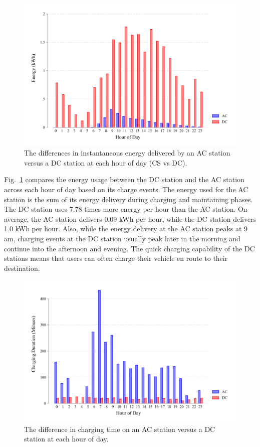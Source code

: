 \begin{figure}[H]
	\centering
	\includegraphics[width=0.8\linewidth]{acdc_e}
	\caption[Energy delivered by an AC station versus a DC station]{The differences in instantaneous energy delivered by an AC station versus a DC station at each hour of day (CS vs DC).}
	\label{fig:10:acdc_e}
\end{figure}

Fig.~\ref{fig:10:acdc_e} compares the energy usage between the DC station and the AC station across each hour of day based on its charge events. The energy used for the AC station is the sum of its energy delivery during charging and maintaining phases. The DC station uses 7.78 times more energy per hour than the AC station. On average, the AC station delivers 0.09 kWh per hour, while the DC station delivers 1.0 kWh per hour. Also, while the energy delivery at the AC station peaks at 9 am, charging events at the DC station usually peak later in the morning and continue into the afternoon and evening. The quick charging capability of the DC stations means that users can often charge their vehicle en route to their destination. 

\begin{figure}[H]
	\centering
	\includegraphics[width=0.8\linewidth]{acdc_h}
	\caption[Charging time on an AC station versus a DC station]{The difference in charging time on an AC station versus a DC station at each hour of day.}
	\label{fig:10:acdc_h}
\end{figure}

